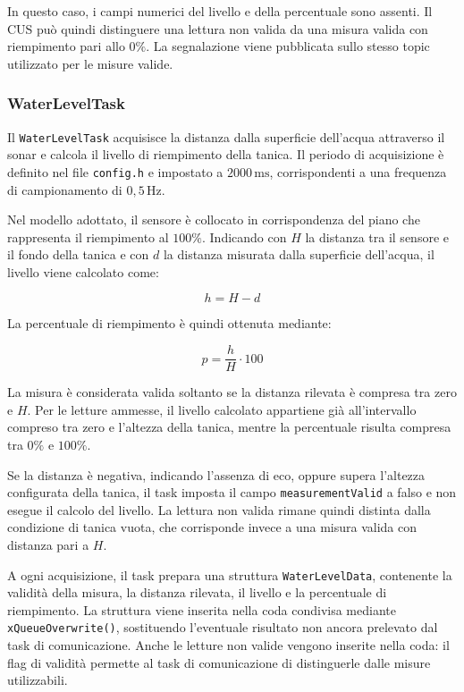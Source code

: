 In questo caso, i campi numerici del livello e della
percentuale sono assenti.
Il CUS può quindi distinguere una lettura non valida
da una misura valida con riempimento pari allo \(0\%\).
La segnalazione viene pubblicata sullo stesso topic
utilizzato per le misure valide.


\subsubsection{WaterLevelTask}
\label{subsec:tms-water-level}

Il \texttt{WaterLevelTask} acquisisce la distanza dalla superficie
dell'acqua attraverso il sonar e calcola il livello di riempimento
della tanica.
Il periodo di acquisizione è definito nel file \texttt{config.h}
e impostato a \(2000\,\mathrm{ms}\), corrispondenti a una frequenza
di campionamento di \(0{,}5\,\mathrm{Hz}\).

Nel modello adottato, il sensore è collocato in corrispondenza
del piano che rappresenta il riempimento al \(100\%\).
Indicando con \(H\) la distanza tra il sensore e il fondo
della tanica e con \(d\) la distanza misurata dalla superficie
dell'acqua, il livello viene calcolato come:

\[
    h = H - d
\]

La percentuale di riempimento è quindi ottenuta mediante:

\[
    p = \frac{h}{H} \cdot 100
\]

La misura è considerata valida soltanto se la distanza rilevata
è compresa tra zero e \(H\).
Per le letture ammesse, il livello calcolato appartiene già
all'intervallo compreso tra zero e l'altezza della tanica,
mentre la percentuale risulta compresa tra \(0\%\) e \(100\%\).

Se la distanza è negativa, indicando l'assenza di eco,
oppure supera l'altezza configurata della tanica, il task
imposta il campo \texttt{measurementValid} a falso
e non esegue il calcolo del livello.
La lettura non valida rimane quindi distinta dalla condizione
di tanica vuota, che corrisponde invece a una misura valida
con distanza pari a \(H\).

A ogni acquisizione, il task prepara una struttura
\texttt{WaterLevelData}, contenente la validità della misura,
la distanza rilevata, il livello e la percentuale di riempimento.
La struttura viene inserita nella coda condivisa mediante
\texttt{xQueueOverwrite()}, sostituendo l'eventuale risultato
non ancora prelevato dal task di comunicazione.
Anche le letture non valide vengono inserite nella coda:
il flag di validità permette al task di comunicazione
di distinguerle dalle misure utilizzabili.

